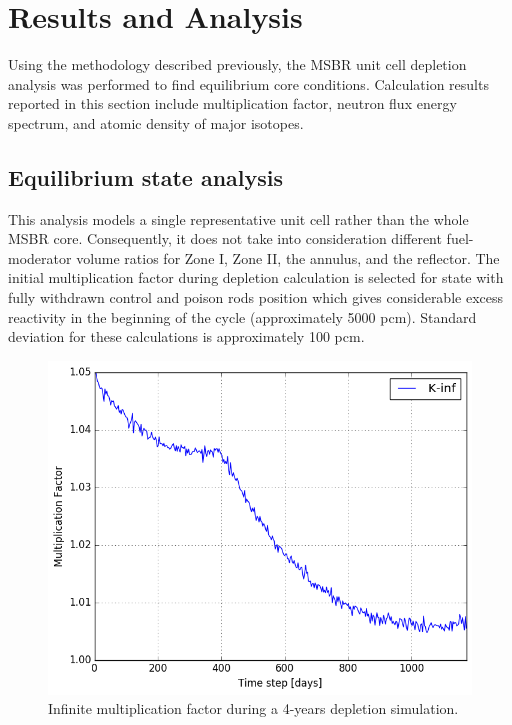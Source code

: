 \documentclass{anstrans}
\begin{document}
\section{Results and Analysis}

Using the methodology described previously, the \gls{MSBR} unit cell depletion 
analysis was performed to find equilibrium core conditions. Calculation results reported 
in this section include multiplication factor, neutron flux energy 
spectrum, and atomic density of major isotopes.

\subsection{Equilibrium state analysis}

This analysis models a single representative unit cell rather than the whole 
\gls{MSBR} core. Consequently, it does not take into consideration different 
fuel-moderator volume ratios for Zone I, Zone II, the annulus, and the reflector. The 
initial multiplication factor during depletion calculation is selected for 
state with fully withdrawn control and poison rods position which gives 
considerable excess reactivity in the beginning of the cycle (approximately 5000 pcm). 
Standard deviation for these calculations is approximately 100 pcm.

\begin{figure}[htbp!] %
        \centering
        \includegraphics[width=1.03\linewidth]{keff.png}
        \caption{Infinite multiplication factor during a 4-years depletion 
        simulation.}
        \label{fig:keff}
\end{figure}
\end{document}

